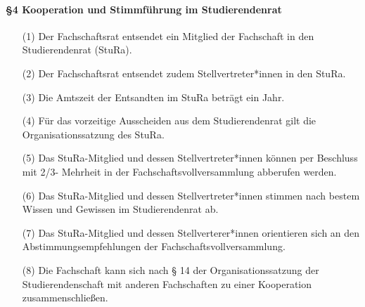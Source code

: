     \paragraph{§4 Kooperation und Stimmführung im Studierendenrat}
    \begin{enumerate}
        \item[(1)] {Der Fachschaftsrat entsendet ein Mitglied der Fachschaft in den Studierendenrat        (StuRa).}
        \item[(2)] {Der Fachschaftsrat entsendet zudem Stellvertreter*innen in den StuRa.}
        \item[(3)] {Die Amtszeit der Entsandten im StuRa beträgt ein Jahr.}
        \item[(4)] {Für das vorzeitige Ausscheiden aus dem Studierendenrat gilt die        Organisationssatzung des StuRa.}
        \item[(5)] {Das StuRa-Mitglied und dessen Stellvertreter*innen können per Beschluss mit 2/3-        Mehrheit in der Fachschaftsvollversammlung abberufen werden.}
        \item[(6)] {Das StuRa-Mitglied und dessen Stellvertreter*innen stimmen nach bestem Wissen und        Gewissen im Studierendenrat ab.}
        \item[(7)] {Das StuRa-Mitglied und dessen Stellverterer*innen orientieren sich an den        Abstimmungsempfehlungen der Fachschaftsvollversammlung.  }
        \item[(8)] {Die Fachschaft kann sich nach § 14 der Organisationssatzung der        Studierendenschaft mit anderen Fachschaften zu einer Kooperation zusammenschließen.}  
    \end{enumerate}
